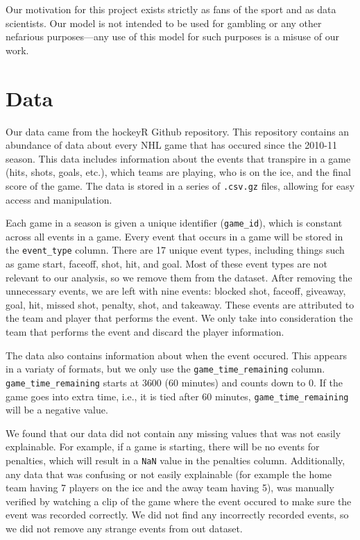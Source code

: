 \documentclass[11pt]{article}
\begin{document}
Our motivation for this project exists strictly as fans of the sport and as data scientists. Our model is not intended to be used for gambling or any other
nefarious purposes—any use of this model for such purposes is a misuse of our work.

\section{Data}
Our data came from the hockeyR Github repository\cite{hockeyR-data}. This repository contains an abundance of data about every NHL game
that has occured since the 2010-11 season. This data includes information about the events that transpire in a game (hits, shots, goals, etc.),
which teams are playing, who is on the ice, and the final score of the game. The data is stored in a series of {\tt .csv.gz} files, allowing for
easy access and manipulation.

Each game in a season is given a unique identifier ({\tt game\_id}), which is constant across all events in a game. Every event that occurs in a game
will be stored in the {\tt event\_type} column. There are 17 unique event types, including things such as game start, faceoff, shot, hit, and goal.
Most of these event types are not relevant to our analysis, so we remove them from the dataset. After removing the unnecessary events, we are left with
nine events: blocked shot, faceoff, giveaway, goal, hit, missed shot, penalty, shot, and takeaway. These events are attributed to the
team and player that performs the event. We only take into consideration the team that performs the event and discard the player information.

The data also contains information about when the event occured. This appears in a variaty of formats, but we only
use the {\tt game\_time\_remaining} column. {\tt game\_time\_remaining} starts
at 3600 (60 minutes) and counts down to 0. If the game goes into extra time, i.e., it is tied after 60 minutes, {\tt game\_time\_remaining} will
be a negative value.

We found that our data did not contain any missing values that was not easily explainable. For example, if a game is starting, there will be no
events for penalties, which will result in a {\tt NaN} value in the penalties column. Additionally, any data that was confusing or not easily explainable
(for example the home team having 7 players on the ice and the away team having 5), was manually verified by watching a clip of the game where
the event occured to make sure the event was recorded correctly. We did not find any incorrectly recorded events, so we 
did not remove any strange events from out dataset.
\end{document}

